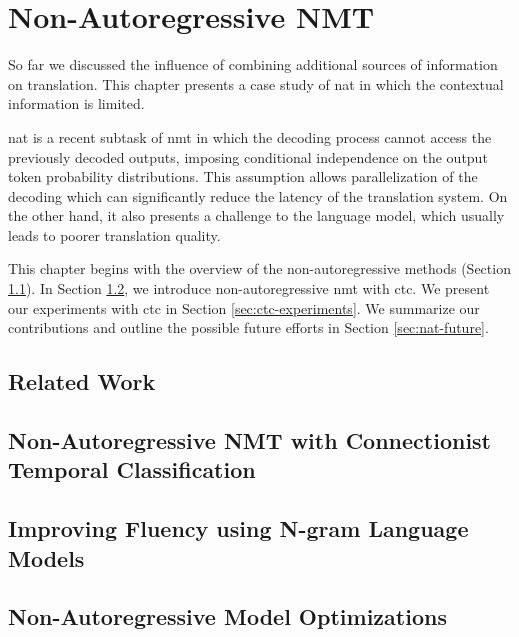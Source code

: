\chapter{Non-Autoregressive NMT}
\label{chap:nat}

So far we discussed the influence of combining additional sources of information
on translation. This chapter presents a case study of \gls{nat} in which the
contextual information is limited.

\gls{nat} is a recent subtask of \gls{nmt} in which the decoding process cannot
access the previously decoded outputs, imposing conditional independence on the
output token probability distributions. This assumption allows parallelization
of the decoding which can significantly reduce the latency of the translation
system. On the other hand, it also presents a challenge to the language model,
which usually leads to poorer translation quality.

This chapter begins with the overview of the non-autoregressive methods (Section
\ref{sec:nat-methods}). In Section \ref{sec:nat-ctc}, we introduce
non-autoregressive \gls{nmt} with \gls{ctc}. We present our experiments with
\gls{ctc} in Section \ref{sec:ctc-experiments}. We summarize our contributions
and outline the possible future efforts in Section \ref{sec:nat-future}.


\section{Related Work}
\label{sec:nat-methods}

\citep{lee2018deterministic} \citep{gu2017nonautoregressive}
\citep{ghazvininejad2019mask} \citep{mansimov2019generalized}

\section{Non-Autoregressive NMT with Connectionist Temporal Classification}
\label{sec:nat-ctc}



\section{Improving Fluency using N-gram Language Models}
\label{sec:nat-lm}


\section{Non-Autoregressive Model Optimizations}
\label{sec:nat-opt}


